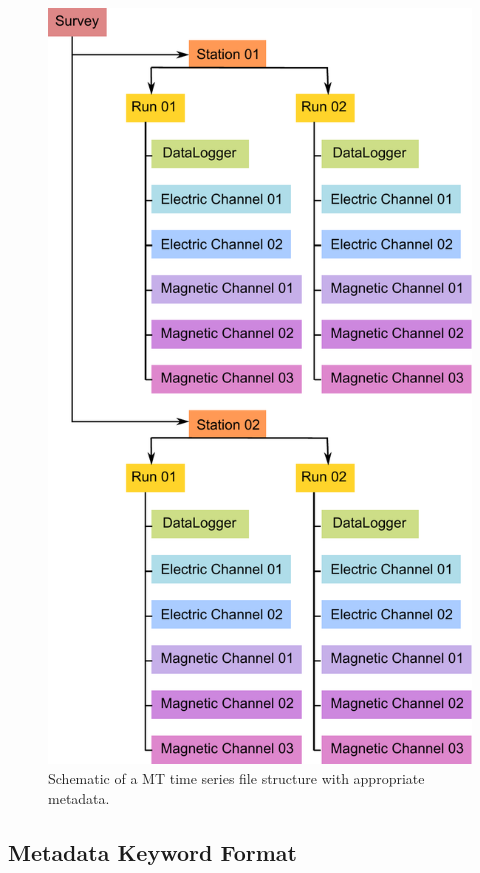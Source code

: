 \documentclass{article}
\begin{document}
\begin{figure}[htb!]
	\centering
	\includegraphics[height=.625\textheight]{example_mt_file_structure.pdf}
	\caption{Schematic of a MT time series file structure with appropriate metadata.}
	\label{fig:example}
\end{figure}

\subsection{Metadata Keyword Format}
\end{document}
